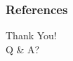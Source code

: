 \documentclass[numfooter,aspectratio=169]{beamer}
\begin{document}
    


  \begin{frame}[plain]
  \frametitle[allowframebreaks]{References}


  \end{frame}

  \ThankYou
  \begin{frame}
  \Large
    Thank You! \\
    Q \& A?
  \end{frame}
\end{document}
